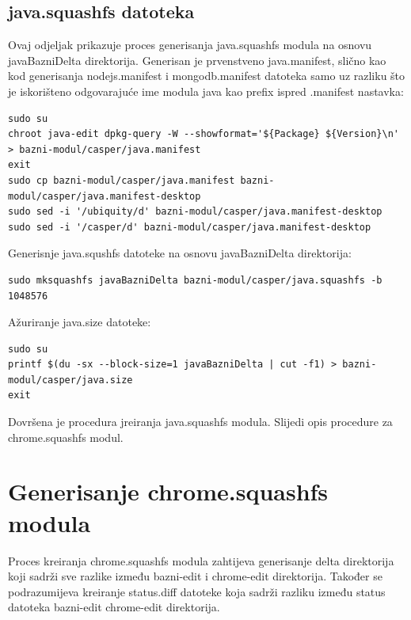 \documentclass[12pt,vi]{mitthesis}
\begin{document}
\subsection*{java.squashfs datoteka}
\noindent
Ovaj odjeljak prikazuje proces generisanja java.squashfs modula na osnovu javaBazniDelta direktorija.
Generisan je prvenstveno java.manifest, slično kao kod generisanja nodejs.manifest i mongodb.manifest datoteka samo uz razliku što je iskorišteno odgovarajuće ime modula java kao prefix ispred .manifest nastavka:
\begin{lstlisting}[style=BashInputStyle]
sudo su
chroot java-edit dpkg-query -W --showformat='${Package} ${Version}\n' > bazni-modul/casper/java.manifest
exit
sudo cp bazni-modul/casper/java.manifest bazni-modul/casper/java.manifest-desktop
sudo sed -i '/ubiquity/d' bazni-modul/casper/java.manifest-desktop
sudo sed -i '/casper/d' bazni-modul/casper/java.manifest-desktop
\end{lstlisting}
\noindent
Generisnje java.squshfs datoteke na osnovu javaBazniDelta direktorija:
\begin{lstlisting}[style=BashInputStyle]
sudo mksquashfs javaBazniDelta bazni-modul/casper/java.squashfs -b 1048576
\end{lstlisting}
\noindent
Ažuriranje java.size datoteke:
\begin{lstlisting}[style=BashInputStyle]
sudo su
printf $(du -sx --block-size=1 javaBazniDelta | cut -f1) > bazni-modul/casper/java.size
exit
\end{lstlisting}
Dovršena je procedura jreiranja java.squashfs modula. Slijedi opis procedure za chrome.squashfs modul.
\section*{Generisanje chrome.squashfs modula}
\noindent
Proces kreiranja chrome.squashfs modula zahtijeva generisanje delta direktorija koji sadrži sve razlike između bazni-edit i chrome-edit direktorija. Također se podrazumijeva kreiranje status.diff datoteke koja sadrži razliku između status datoteka bazni-edit chrome-edit direktorija.
\end{document}
